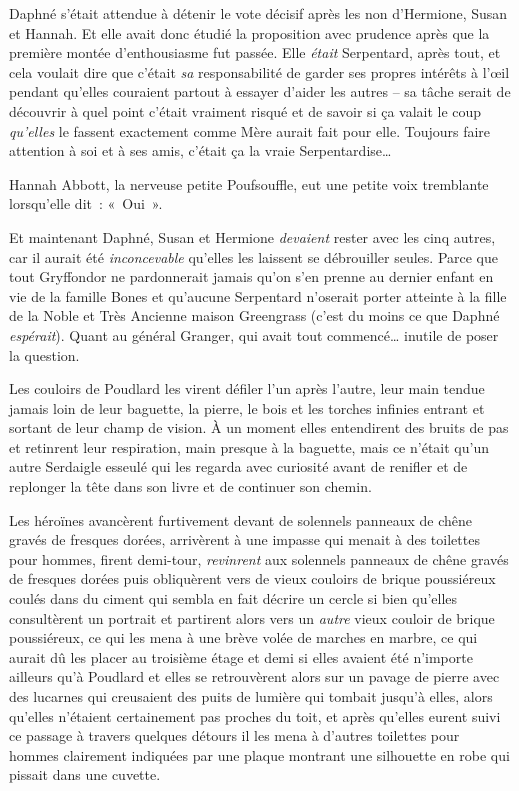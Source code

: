Daphné s'était attendue à détenir le vote décisif après les non d'Hermione, Susan et Hannah. Et elle avait donc étudié la proposition avec prudence après que la première montée d'enthousiasme fut passée. Elle \emph{était} Serpentard, après tout, et cela voulait dire que c'était \emph{sa} responsabilité de garder ses propres intérêts à l'œil pendant qu'elles couraient partout à essayer d'aider les autres -- sa tâche serait de découvrir à quel point c'était vraiment risqué et de savoir si ça valait le coup \emph{qu'elles} le fassent exactement comme Mère aurait fait pour elle. Toujours faire attention à soi et à ses amis, c'était ça la vraie Serpentardise…

Hannah Abbott, la nerveuse petite Poufsouffle, eut une petite voix tremblante lorsqu'elle dit~: «~Oui~».

Et maintenant Daphné, Susan et Hermione \emph{devaient} rester avec les cinq autres, car il aurait été \emph{inconcevable} qu'elles les laissent se débrouiller seules. Parce que tout Gryffondor ne pardonnerait jamais qu'on s'en prenne au dernier enfant en vie de la famille Bones et qu'aucune Serpentard n'oserait porter atteinte à la fille de la Noble et Très Ancienne maison Greengrass (c'est du moins ce que Daphné \emph{espérait}). Quant au général Granger, qui avait tout commencé… inutile de poser la question.

Les couloirs de Poudlard les virent défiler l'un après l'autre, leur main tendue jamais loin de leur baguette, la pierre, le bois et les torches infinies entrant et sortant de leur champ de vision. À un moment elles entendirent des bruits de pas et retinrent leur respiration, main presque à la baguette, mais ce n'était qu'un autre Serdaigle esseulé qui les regarda avec curiosité avant de renifler et de replonger la tête dans son livre et de continuer son chemin.

Les héroïnes avancèrent furtivement devant de solennels panneaux de chêne gravés de fresques dorées, arrivèrent à une impasse qui menait à des toilettes pour hommes, firent demi-tour, \emph{revinrent} aux solennels panneaux de chêne gravés de fresques dorées puis obliquèrent vers de vieux couloirs de brique poussiéreux coulés dans du ciment qui sembla en fait décrire un cercle si bien qu'elles consultèrent un portrait et partirent alors vers un \emph{autre} vieux couloir de brique poussiéreux, ce qui les mena à une brève volée de marches en marbre, ce qui aurait dû les placer au troisième étage et demi si elles avaient été n'importe ailleurs qu'à Poudlard et elles se retrouvèrent alors sur un pavage de pierre avec des lucarnes qui creusaient des puits de lumière qui tombait jusqu'à elles, alors qu'elles n'étaient certainement pas proches du toit, et après qu'elles eurent suivi ce passage à travers quelques détours il les mena à d'autres toilettes pour hommes clairement indiquées par une plaque montrant une silhouette en robe qui pissait dans une cuvette.

